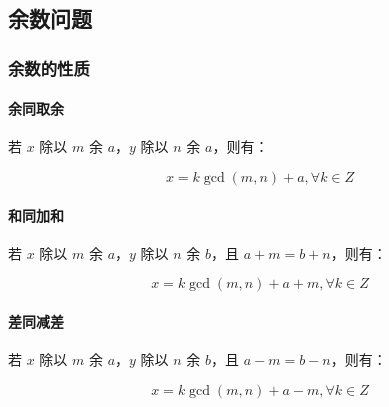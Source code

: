 \subsection{余数问题}

\subsubsection{余数的性质}

\paragraph{余同取余} 若 $x$ 除以 $m$ 余 $a$，$y$ 除以 $n$ 余 $a$，则有：

\[
	x = k\gcd (m,n) + a, \forall k \in Z
\]

\paragraph{和同加和} 若 $x$ 除以 $m$ 余 $a$，$y$ 除以 $n$ 余 $b$，且 $a + m = b + n$，则有：

\[
	x = k\gcd (m,n) + a + m, \forall k \in Z
\]

\paragraph{差同减差} 若 $x$ 除以 $m$ 余 $a$，$y$ 除以 $n$ 余 $b$，且 $a - m = b - n$，则有：

\[
	x = k\gcd (m,n) + a - m, \forall k \in Z
\]